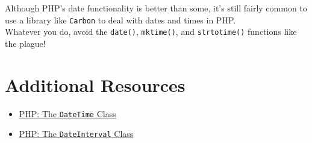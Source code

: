\hr

Although PHP's date functionality is better than some, it's still fairly common to use a library like \texttt{Carbon} to deal with dates and times in PHP.
\\

Whatever you do, avoid the \texttt{date()}, \texttt{mktime()}, and \texttt{strtotime()} functions like the plague!

\section{Additional Resources}

\begin{itemize}[leftmargin=*]
    \item \href{http://www.php.net/manual/en/class.datetime.php}{PHP: The \texttt{DateTime} Class}
    \item \href{http://www.php.net/manual/en/class.dateinterval.php}{PHP: The \texttt{DateInterval} Class}
\end{itemize}
